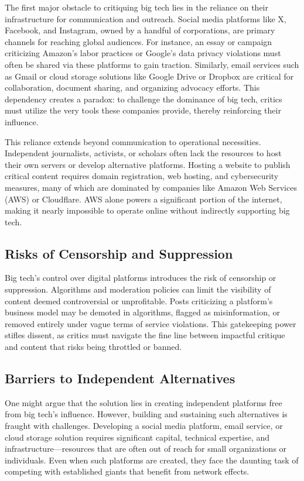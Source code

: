 \documentclass{article}
\begin{document}
The first major obstacle to critiquing big tech lies in the reliance on their infrastructure for communication and outreach. Social media platforms like X, Facebook, and Instagram, owned by a handful of corporations, are primary channels for reaching global audiences. For instance, an essay or campaign criticizing Amazon’s labor practices or Google’s data privacy violations must often be shared via these platforms to gain traction. Similarly, email services such as Gmail or cloud storage solutions like Google Drive or Dropbox are critical for collaboration, document sharing, and organizing advocacy efforts. This dependency creates a paradox: to challenge the dominance of big tech, critics must utilize the very tools these companies provide, thereby reinforcing their influence.

This reliance extends beyond communication to operational necessities. Independent journalists, activists, or scholars often lack the resources to host their own servers or develop alternative platforms. Hosting a website to publish critical content requires domain registration, web hosting, and cybersecurity measures, many of which are dominated by companies like Amazon Web Services (AWS) or Cloudflare. AWS alone powers a significant portion of the internet, making it nearly impossible to operate online without indirectly supporting big tech.

\subsection{Risks of Censorship and Suppression}

Big tech’s control over digital platforms introduces the risk of censorship or suppression. Algorithms and moderation policies can limit the visibility of content deemed controversial or unprofitable. Posts criticizing a platform’s business model may be demoted in algorithms, flagged as misinformation, or removed entirely under vague terms of service violations. This gatekeeping power stifles dissent, as critics must navigate the fine line between impactful critique and content that risks being throttled or banned.

\subsection{Barriers to Independent Alternatives}

One might argue that the solution lies in creating independent platforms free from big tech’s influence. However, building and sustaining such alternatives is fraught with challenges. Developing a social media platform, email service, or cloud storage solution requires significant capital, technical expertise, and infrastructure—resources that are often out of reach for small organizations or individuals. Even when such platforms are created, they face the daunting task of competing with established giants that benefit from network effects.
\end{document}
